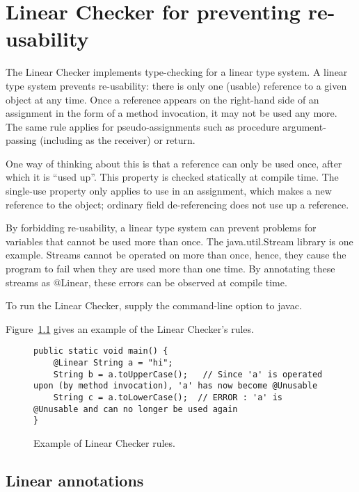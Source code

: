 \htmlhr
\chapter{Linear Checker for preventing re-usability\label{linear-checker}}

The Linear Checker implements type-checking for a linear type system.  A
linear type system prevents re-usability:  there is only one (usable) reference
to a given object at any time.  Once a reference appears on the right-hand
side of an assignment in the form of a method invocation, it may not be used any more.  The same rule applies
for pseudo-assignments such as procedure argument-passing (including as the
receiver) or return.

One way of thinking about this is that a reference can only be used once,
after which it is ``used up''.  This property is checked statically at
compile time.  The single-use property only applies to use in an
assignment, which makes a new reference to the object; ordinary field
de-referencing does not use up a reference.

By forbidding re-usability, a linear type system can prevent problems for variables that cannot be used more than once.
The java.util.Stream library is one example. Streams cannot be operated on more than once, hence, they cause the program
to fail when they are used more than one time. By annotating these streams as @Linear, these errors can be observed at
compile time.

To run the Linear Checker, supply the
command-line option to javac.

Figure~\ref{fig-linear-example} gives an example of the Linear Checker's rules.

\begin{figure}
\begin{smaller}
\begin{Verbatim}
public static void main() {
    @Linear String a = "hi";
    String b = a.toUpperCase();   // Since 'a' is operated upon (by method invocation), 'a' has now become @Unusable
    String c = a.toLowerCase();  // ERROR : 'a' is @Unusable and can no longer be used again
}
\end{Verbatim}
\end{smaller}
\caption{Example of Linear Checker rules.}
\label{fig-linear-example}
\end{figure}

\section{Linear annotations\label{linear-annotations}}

